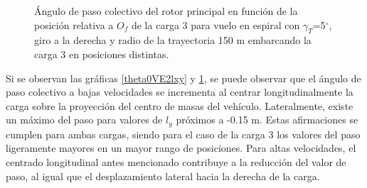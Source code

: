 \begin{figure}
	\centering
	\caption{Ángulo de paso colectivo del rotor principal en función de la posición relativa a $O_f$ de la carga 3 para vuelo en espiral con $\gamma_T$=5$^\circ$, giro a la derecha y radio de la trayectoria 150 m embarcando la carga 3 en posiciones distintas.}
	\label{theta0VE3lxy}
\end{figure}

Si se observan las gráficas \ref{theta0VE2lxy} y \ref{theta0VE3lxy}, se puede observar que el ángulo de paso colectivo a bajas velocidades se incrementa al centrar longitudinalmente la carga sobre la proyección del centro de masas del vehículo. Lateralmente, existe un máximo del paso para valores de $l_y$ próximos a -0.15 m. Estas afirmaciones se cumplen para ambas cargas, siendo para el caso de la carga 3 los valores del paso ligeramente mayores en un mayor rango de posiciones.
Para altas velocidades, el centrado longitudinal antes mencionado contribuye a la reducción del valor de paso, al igual que el desplazamiento lateral hacia la derecha de la carga.


